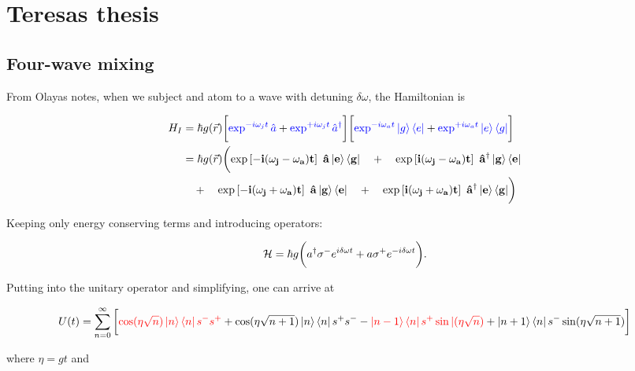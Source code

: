 \newpage\section{Teresas thesis}
 \subsection{Four-wave mixing}
  From Olayas notes, when we subject and atom to a wave with detuning $ \delta\omega $, the Hamiltonian is
  
  \begin{equation}
  \begin{aligned}
  H_I & = \hbar g(\vec{r})\bigg[\blue{\exp^{-i\omega_jt}\hat{a}}+\blue{\exp^{+i\omega_jt}\hat{a}^\dagger}\bigg]\bigg[\blue{\exp^{-i\omega_at}\ketbra{g}{e}}+\blue{\exp^{+i\omega_at}\ketbra{e}{g}}\bigg] \\
  & = \hbar g(\vec{r})\bigg(\mathbf{\exp\left[-i(\omega_j-\omega_a)t\right]\ \hat{a}\ketbra{e}{g}} \quad + \quad \mathbf{\exp\left[i(\omega_j-\omega_a)t\right]\ \hat{a}^\dagger\ketbra{g}{e}} \\
  & \quad + \quad \mathbf{\exp\left[-i(\omega_j+\omega_a)t\right]\ \hat{a}\ketbra{g}{e}} \quad + \quad \mathbf{\exp\left[i(\omega_j+\omega_a)t\right]\ \hat{a}^\dagger\ketbra{e}{g}}\bigg)
  \end{aligned}
  \label{eqn:fullHamiltonianLightAtom}
  \end{equation}
  
  \noindent Keeping only energy conserving terms and introducing operators:
  
  \begin{equation}\label{key}
  	\mathcal{H} = \hbar g\bigg(a^{\dagger}\sigma^{-} e^{i\delta\omega t} + a\sigma^{+} e^{-i\delta\omega t}\bigg).
  \end{equation}
  
  \noindent Putting into the unitary operator and simplifying, one can arrive at
  
  {\footnotesize\begin{equation}\label{eqn:teresa_1}
  	U(t) = \sum_{n=0}^{\infty}\bigg[{\color{red}{\cos(\eta\sqrt{n}) \ket{n}\bra{n} s^{-}s^{+}}} + {\cos(\eta\sqrt{n+1})\ket{n}\bra{n}s^{+}s^{-}} - {\color{red}{ \ket{n-1}\bra{n} s^{+}\sin|(\eta\sqrt{n})}}+\ket{n+1}\bra{n}s^{-}\sin(\eta\sqrt{n+1})\bigg]
  \end{equation}}
  
  \noindent where $ \eta = gt $ and

